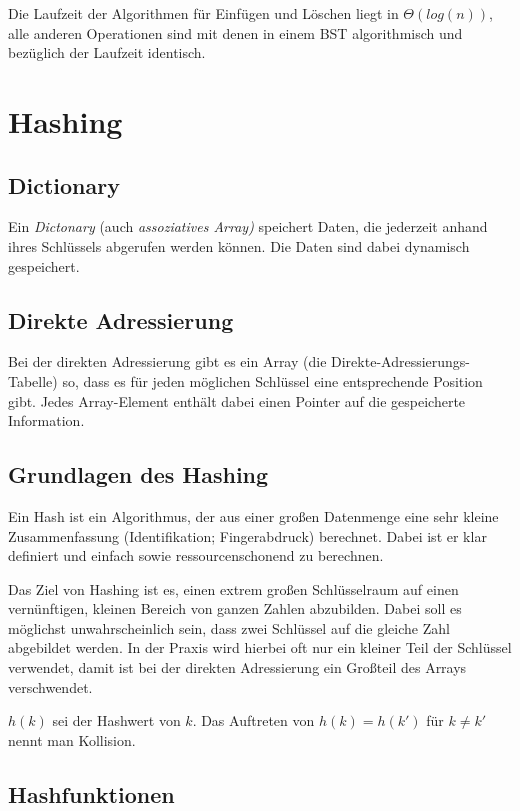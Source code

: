 \documentclass[12pt]{article}
\begin{document}
Die Laufzeit der Algorithmen für Einfügen und Löschen liegt in $\Theta(log(n))$, alle anderen Operationen sind mit denen in einem BST algorithmisch und bezüglich der Laufzeit identisch.

\section{Hashing}

\subsection{Dictionary}

Ein \textit{Dictonary} (auch \textit{assoziatives Array)} speichert Daten, die jederzeit anhand ihres Schlüssels abgerufen werden können. Die Daten sind dabei dynamisch gespeichert.

\subsection{Direkte Adressierung}

Bei der direkten Adressierung gibt es ein Array (die Direkte-Adressierungs-Tabelle) so, dass es für jeden möglichen Schlüssel eine entsprechende Position gibt. Jedes Array-Element enthält dabei einen Pointer auf die gespeicherte Information.

\subsection{Grundlagen des Hashing}

Ein Hash ist ein Algorithmus, der aus einer großen Datenmenge eine sehr kleine Zusammenfassung (Identifikation; Fingerabdruck) berechnet. Dabei ist er klar definiert und einfach sowie ressourcenschonend zu berechnen.

Das Ziel von Hashing ist es, einen extrem großen Schlüsselraum auf einen vernünftigen, kleinen Bereich von ganzen Zahlen abzubilden. Dabei soll es möglichst unwahrscheinlich sein, dass zwei Schlüssel auf die gleiche Zahl abgebildet werden. In der Praxis wird hierbei oft nur ein kleiner Teil der Schlüssel verwendet, damit ist bei der direkten Adressierung ein Großteil des Arrays verschwendet.

$h(k)$ sei der Hashwert von $k$. Das Auftreten von $h(k) = h(k')$ für $k \neq k'$ nennt man Kollision.

\subsection{Hashfunktionen}
\end{document}
